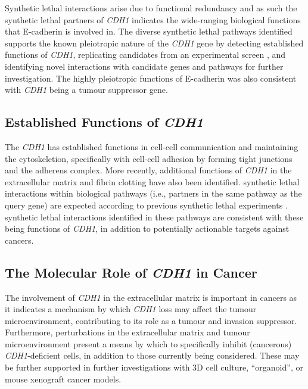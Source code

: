 Synthetic lethal interactions arise due to \gls{functional redundancy} \citep{Boone2007, Kaelin2005, Fece2015} and as such the \gls{synthetic lethal} partners of \textit{CDH1} indicates the wide-ranging biological functions that \gls{E-cadherin} is involved in. The diverse \gls{synthetic lethal} pathways identified supports the known pleiotropic nature of the \textit{CDH1} gene by detecting established functions of \textit{CDH1}, replicating candidates from an experimental screen \citep{Telford2015}, and identifying novel interactions with candidate genes and pathways for further investigation. The highly pleiotropic functions of \gls{E-cadherin} was also consistent with \textit{CDH1} being a \gls{tumour suppressor} gene. %

\subsection{Established Functions of \textit{CDH1}}
\label{chapt6:function}

The \textit{CDH1} has established functions in cell-cell communication and maintaining the cytoskeletion, specifically with cell-cell adhesion by forming tight junctions and the adherens complex. More recently, additional functions of \textit{CDH1} in the extracellular matrix and fibrin clotting have also been identified. \Gls{synthetic lethal} interactions within biological pathways (i.e., partners in the same pathway as the query gene) are expected according to previous \gls{synthetic lethal} experiments \citep{Kelley2005, Boone2007}. \Gls{synthetic lethal} interactions identified in these pathways are consistent with these being functions of \textit{CDH1}, in addition to potentially actionable targets against cancers.


\subsection{The Molecular Role of \textit{CDH1} in Cancer}
\label{chapt6:cancer}

The involvement of \textit{CDH1} in the extracellular matrix is important in cancers as it indicates a mechanism by which \textit{CDH1} loss may affect the tumour microenvironment, contributing to its role as a tumour and invasion suppressor. Furthermore, perturbations in the extracellular matrix and tumour microenvironment present a means by which to specifically inhibit (cancerous) \textit{CDH1}-deficient cells, in addition to those currently being considered. 
These may be further supported in further investigations with 3D cell culture, ``organoid'', or mouse xenograft cancer models.

